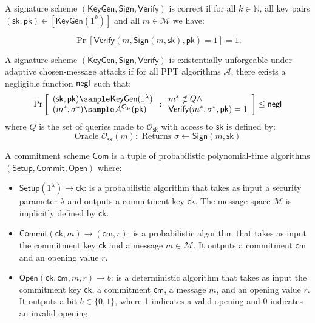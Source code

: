 \begin{definition}[Correctness]
A signature scheme $(\mathsf{KeyGen}, \mathsf{Sign}, \mathsf{Verify})$ is correct if for all $k \in \mathbb{N}$, all key pairs $(\mathsf{sk}, \mathsf{pk}) \in [\mathsf{KeyGen}(1^k)]$ and all $m \in \mathcal{M}$ we have:

$$\Pr[\mathsf{Verify}(m, \mathsf{Sign}(m, \mathsf{sk}), \mathsf{pk}) = 1] = 1.$$
\end{definition}

\begin{definition}
A signature scheme $(\mathsf{KeyGen}, \mathsf{Sign}, \mathsf{Verify})$ is existentially unforgeable under adaptive chosen-message attacks if for all PPT algorithms $\mathcal{A}$, there exists a negligible function $\mathsf{negl}$ such that:
$$\Pr\left[\begin{array}{l}
    (\mathsf{sk}, \mathsf{pk}) \sample \mathsf{KeyGen}(1^\lambda) \\
    (m^*, \sigma^*) \sample \mathcal{A}^{\mathcal{O}_{\mathsf{sk}}}(\mathsf{pk})
\end{array} : \begin{array}{l}
    m^* \notin Q \land \\
    \mathsf{Verify}(m^*, \sigma^*, \mathsf{pk}) = 1
\end{array}\right] \leq \negl$$
where $Q$ is the set of queries made to $\mathcal{O}_{\mathsf{sk}}$ with access to $\mathsf{sk}$ is defined by:
\[
\text{Oracle }\mathcal{O}_{\mathsf{sk}}(m): \text{ Returns } \sigma \gets \mathsf{Sign}(m, \mathsf{sk})
\]
\end{definition}

\begin{definition}\label{def:commitmentscheme}
A commitment scheme $\mathsf{Com}$ is a tuple of probabilistic polynomial-time algorithms $(\mathsf{Setup}, \mathsf{Commit}, \mathsf{Open})$ where:
\begin{itemize}
    \item $\mathsf{Setup}(1^\lambda) \rightarrow \mathsf{ck}$: is a probabilistic algorithm that takes as input a security parameter $\lambda$ and outputs a commitment key $\mathsf{ck}$. The message space $\mathcal{M}$ is implicitly defined by $\mathsf{ck}$.
    
    \item $\mathsf{Commit}(\mathsf{ck}, m) \rightarrow (\mathsf{cm}, r)$: is a probabilistic algorithm that takes as input the commitment key $\mathsf{ck}$ and a message $m \in \mathcal{M}$. It outputs a commitment $\mathsf{cm}$ and an opening value $r$.
    
    \item $\mathsf{Open}(\mathsf{ck}, \mathsf{cm}, m, r) \rightarrow b$: is a deterministic algorithm that takes as input the commitment key $\mathsf{ck}$, a commitment $\mathsf{cm}$, a message $m$, and an opening value $r$. It outputs a bit $b \in \{0,1\}$, where 1 indicates a valid opening and 0 indicates an invalid opening.
\end{itemize}
\end{definition}

